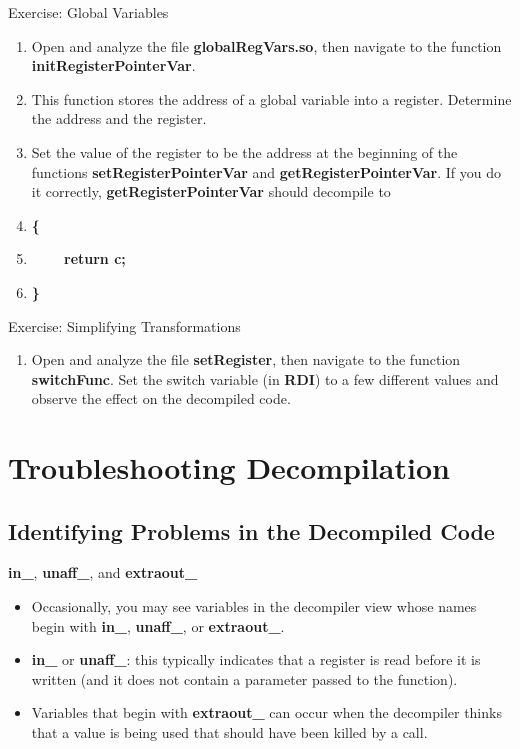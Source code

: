 \documentclass{beamer}
\begin{document}
\begin{frame}
\begin{block}{Exercise: Global Variables}
\begin{enumerate}
\item Open and analyze the file \textbf{globalRegVars.so}, then navigate to the function \textbf{initRegisterPointerVar}.  
\item This function stores the address of a global variable into a register.  Determine the address and the register.
\item Set the value of the register to be the address at the beginning of the functions \textbf{setRegisterPointerVar} and \textbf{getRegisterPointerVar}. If you do it correctly,
\textbf{getRegisterPointerVar} should decompile to 
\item[]\textbf{\{}
\item[]\textbf{~~~~return c;}
\item[]\textbf{\}}
\end{enumerate}
\end{block}
\end{frame}

\begin{frame}
\begin{block}{Exercise: Simplifying Transformations}
\begin{enumerate}
\item Open and analyze the file \textbf{setRegister}, then navigate to the function \textbf{switchFunc}.  Set the switch variable (in \textbf{RDI}) to a few different values and
observe the effect on the decompiled code.
\end{enumerate}
\end{block}
\end{frame}


\section{Troubleshooting Decompilation}

\subsection{Identifying Problems in the Decompiled Code}

\begin{frame}
\begin{block}{\textbf{in\_}, \textbf{unaff\_}, and \textbf{extraout\_}}
\begin{itemize}
\item Occasionally, you may see variables in the decompiler view whose names begin with \textbf{in\_}, \textbf{unaff\_}, or \textbf{extraout\_}.
\item \textbf{in\_} or \textbf{unaff\_}: this typically indicates that a register is read before it is written (and it does not contain a parameter passed to the function).
\item Variables that begin with \textbf{extraout\_} can occur when the decompiler thinks that a value is being used that should have been killed by a call. 
\end{itemize}
\end{block}
\end{frame}
\end{document}
